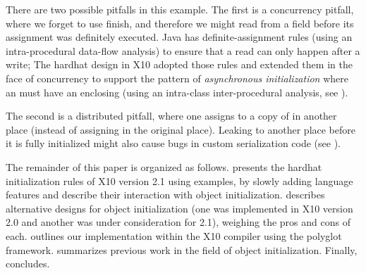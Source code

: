 There are two possible pitfalls in this example.
The first is a concurrency pitfall, where we forget to use finish,
    and therefore we might read from a field before its assignment was definitely executed.
Java has definite-assignment rules (using an intra-procedural data-flow analysis)
    to ensure that a read can only happen after a write;
    The hardhat design in X10 adopted those rules
        and extended them in the face of concurrency to support the pattern of
            \emph{asynchronous initialization}
            where an  must have an enclosing 
    (using an intra-class inter-procedural analysis, see ).

The second is a distributed pitfall, where
    one assigns to a copy of \this in another place (instead of assigning in the original place).
Leaking \this to another place before it is fully initialized
    might also cause bugs in custom serialization code (see ).



The remainder of this paper is organized as follows.
 presents the hardhat initialization rules of X10 version 2.1
    using examples,
    by slowly adding language features and describe their interaction with
    object initialization.
 describes alternative designs for object initialization
    (one was implemented in X10 version 2.0 and another was under consideration for 2.1),
    weighing the pros and cons of each.
 outlines our implementation within the X10 compiler using the polyglot framework.
 summarizes previous work in the field of object initialization.
Finally,  concludes.
